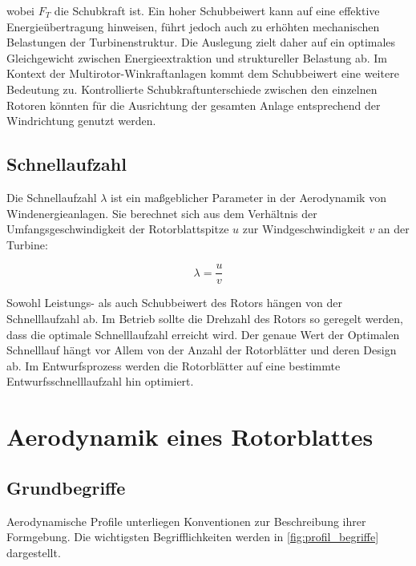 wobei \( F_T \) die Schubkraft ist. Ein hoher Schubbeiwert kann auf eine effektive Energieübertragung hinweisen, führt jedoch auch zu erhöhten mechanischen Belastungen der Turbinenstruktur. Die Auslegung zielt daher auf ein optimales Gleichgewicht zwischen Energieextraktion und struktureller Belastung ab. Im Kontext der Multirotor-Winkraftanlagen kommt dem Schubbeiwert eine weitere Bedeutung zu. Kontrollierte Schubkraftunterschiede zwischen den einzelnen Rotoren könnten für die Ausrichtung der gesamten Anlage entsprechend der Windrichtung genutzt werden. 

\subsection{Schnellaufzahl}
Die Schnellaufzahl \( \lambda \) ist ein maßgeblicher Parameter in der Aerodynamik von Windenergieanlagen. Sie berechnet sich aus dem Verhältnis der Umfangsgeschwindigkeit der Rotorblattspitze \( u \) zur Windgeschwindigkeit \( v \) an der Turbine:

\begin{equation}
\lambda = \frac{u}{v}
\end{equation}

Sowohl Leistungs- als auch Schubbeiwert des Rotors hängen von der Schnelllaufzahl ab. Im Betrieb sollte die Drehzahl des Rotors so geregelt werden, dass die optimale Schnelllaufzahl erreicht wird. Der genaue Wert der Optimalen Schnelllauf hängt vor Allem von der Anzahl der Rotorblätter und deren Design ab. Im Entwurfsprozess werden die Rotorblätter auf eine bestimmte Entwurfsschnelllaufzahl hin optimiert.

\section{Aerodynamik eines Rotorblattes}
\subsection{Grundbegriffe}
Aerodynamische Profile unterliegen Konventionen zur Beschreibung ihrer Formgebung. Die wichtigsten Begrifflichkeiten werden in \ref{fig:profil_begriffe} dargestellt.


